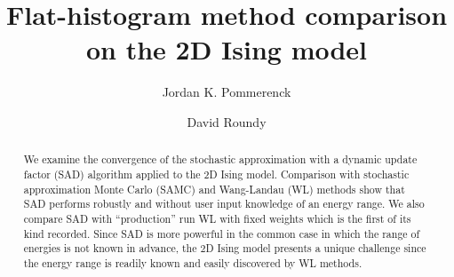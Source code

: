 \documentclass[letterpaper,twocolumn,amsmath,amssymb,pre,aps,10pt]{revtex4-1}
\begin{document}
\title{Flat-histogram method comparison on the 2D Ising model
}

\author{Jordan K. Pommerenck} \author{David Roundy}

\begin{abstract}
We examine the convergence of the stochastic approximation with a dynamic
update factor (SAD) algorithm applied to the 2D Ising model. Comparison with
stochastic approximation Monte Carlo (SAMC) and Wang-Landau (WL) methods show that SAD performs robustly and without user input knowledge of an energy range. We also compare SAD with ``production'' run WL with fixed weights which is the first of its kind recorded. Since SAD is more powerful in the common case in which the range of energies is not known in advance, the 2D Ising model presents a unique challenge since the energy range is readily known and easily discovered by WL methods.
\end{abstract}

\maketitle



\end{document}
